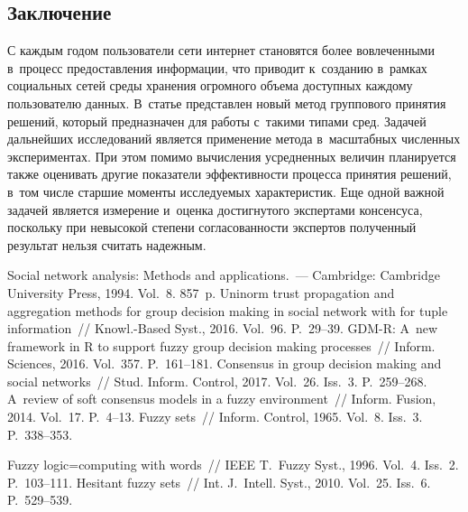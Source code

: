 \begin{multicols}{2}
\section{Заключение}

  С каждым годом пользователи сети интернет становятся более 
вовлеченными в~процесс предо\-став\-ле\-ния информации, что приводит 
к~созданию в~рамках социальных сетей среды хранения огромного объема 
доступных каждому пользователю данных. В~статье представлен новый метод 
группового принятия решений, который предназначен для работы с~такими 
типами сред. Задачей дальнейших исследований является применение метода 
в~масштабных численных экспериментах. При этом помимо вычисления 
усредненных величин планируется также оценивать другие показатели 
эффективности процесса принятия решений, в~том числе старшие моменты 
исследуемых характеристик. Еще одной важной задачей является измерение 
и~оценка достигнутого экспертами консенсуса, поскольку при невысокой 
степени согласованности экспертов полученный результат нельзя считать 
надежным. 
  
{\small\frenchspacing
 {%
 \begin{thebibliography}{99}
 Social network analysis: Methods and applications.~--- 
Cambridge: Cambridge University Press, 1994. Vol.~8. 857~p.
 Uninorm trust propagation and aggregation methods for 
group decision making in social network with for tuple information~// Knowl.-Based 
Syst., 2016. Vol.~96. P.~29--39.
 GDM-R: 
A~new framework in R to support fuzzy group decision making processes~// Inform. 
Sciences, 2016. Vol.~357. P.~161--181.
Consensus in group decision making and social networks~// Stud. Inform.  Control, 2017. 
Vol.~26. Iss.~3. P.~259--268.
 A~review of soft 
consensus models in a fuzzy environment~// Inform. Fusion, 2014. Vol.~17. P.~4--13.
 Fuzzy sets~// Inform. Control, 1965. Vol.~8. Iss.~3. P.~338--353.

 Fuzzy logic\;=\;computing with words~// IEEE T.~Fuzzy Syst., 1996. 
Vol.~4. Iss.~2. P.~103--111.
 Hesitant fuzzy sets~// Int. J.~Intell. Syst., 2010. Vol.~25. 
Iss.~6. P.~529--539.


\end{thebibliography}}}
\end{multicols}
